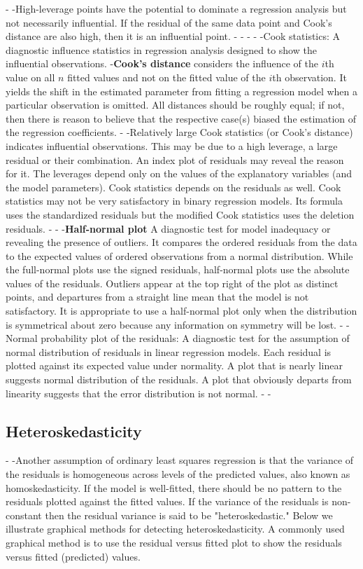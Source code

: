 -
-High-leverage points have the potential to dominate a regression analysis but not necessarily influential. If the residual of the same data point and Cook's distance are also high, then it is an influential point.
-
-
-
-
-Cook statistics: A diagnostic influence statistics in regression analysis designed to show the influential observations.
-\textbf{Cook's distance} considers the influence of the $i$th value on all $n$ fitted values and not on the fitted value of the $i$th observation. It yields the shift in the estimated parameter from fitting a regression model when a particular observation is omitted. All distances should be roughly equal; if not, then there is reason to believe that the respective case(s) biased the estimation of the regression coefficients.
-
-Relatively large Cook statistics (or Cook's distance) indicates influential observations. This may be due to a high leverage, a large residual or their combination. An index plot of residuals may reveal the reason for it. The leverages depend only on the values of the explanatory variables (and the model parameters). Cook statistics depends on the residuals as well. Cook statistics may not be very satisfactory in binary regression models. Its formula uses the standardized residuals but the modified Cook statistics uses the deletion residuals.
-
-%
-\textbf{Half-normal plot} A diagnostic test for model inadequacy or revealing the presence of outliers. It compares the ordered residuals from the data to the expected values of ordered observations from a normal distribution. While the full-normal plots use the signed residuals, half-normal plots use the absolute values of the residuals. Outliers appear at the top right of the plot as distinct points, and departures from a straight line mean that the model is not satisfactory. It is appropriate to use a half-normal plot only when the distribution is symmetrical about zero because any information on symmetry will be lost.
-
-Normal probability plot of the residuals: A diagnostic test for the assumption of normal distribution of residuals in linear regression models. Each residual is plotted against its expected value under normality. A plot that is nearly linear suggests normal distribution of the residuals. A plot that obviously departs from linearity suggests that the error distribution is not normal.
-
-\subsection{Heteroskedasticity}
-
-Another assumption of ordinary least squares regression is that the variance of the residuals is homogeneous across levels of the predicted values, also known as homoskedasticity. If the model is well-fitted, there should be no pattern to the residuals plotted against the fitted values. If the variance of the residuals is non-constant then the residual variance is said to be "heteroskedastic." Below we illustrate graphical methods for detecting heteroskedasticity. A commonly used graphical method is to use the residual versus fitted plot to show the residuals versus fitted (predicted) values.
